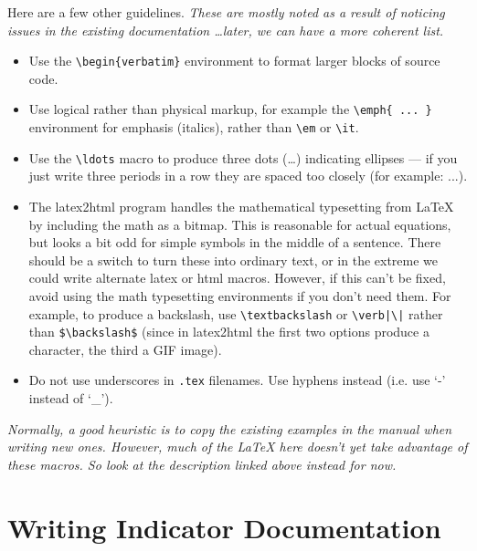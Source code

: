 Here are a few other guidelines.  \emph{These are mostly noted as a result
  of noticing issues in the existing documentation \ldots later, we can
  have a more coherent list.}

\begin{itemize}

\item Use the \verb|\begin{verbatim}| environment to format larger blocks of
source code.

\item Use logical rather than physical markup, for example the
\verb|\emph{ ... }| environment for emphasis (italics), rather than
\verb|\em| or \verb|\it|.

\item Use the \verb|\ldots| macro to produce three dots (\ldots) indicating
  ellipses --- if you just write three periods in a row they are spaced too
  closely (for example: ...).

\item The latex2html \latexindex program handles the mathematical typesetting from
  \LaTeX{} \latexindex by including the math as a bitmap.  This is reasonable for
  actual equations, but looks a bit odd for simple symbols in the middle of
  a sentence.  There should be a switch to turn these into ordinary text,
  or in the extreme we could write alternate latex \latexindex or html macros.
  However, if this can't be fixed, avoid using the math typesetting
  environments if you don't need them.  For example, to produce a
  backslash, use \verb|\textbackslash| or \verb$\verb|\|$ rather than
  \verb|$\backslash$| (since in latex2html \latexindex the first two options produce a
  character, the third a GIF image).

\item Do not use underscores in \verb|.tex| filenames. Use hyphens instead (i.e. use `-' instead of `_').

\end{itemize}


\emph{Normally, a good heuristic is to copy the existing examples in the
  manual when writing new ones.  However, much of the \LaTeX{} here doesn't yet
  take advantage of these macros.  So look at the description linked above
  instead for now.}

\section{Writing Indicator Documentation}
\label{sec:writing-indicators}

